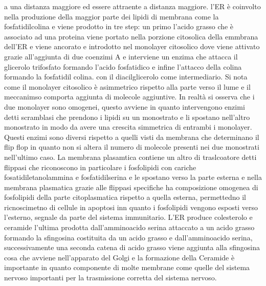 a una distanza maggiore ed essere attraente a distanza maggiore. l'ER \`e coinvolto nella produzione della maggior parte dei lipidi di membrana come la fosfatidilcolina e viene prodotto
in tre step: un primo l'acido grasso che \`e associato ad una proteina viene portato nella porzione citosolica della emmbrana dell'ER e viene ancorato e introdotto nel monolayer 
citosolico dove viene attivato grazie all'aggiunta di due coenzimi A e interviene un enzima che attacca il glicerolo trifosfato formando l'acido fosfatidico e infine l'attacco della 
colina formando la fosfatidil colina.  con il diacilglicerolo come intermediario. Si nota come il monolayer citosolico \`e asimmetrico rispetto alla parte verso il lume e il meccanimso
comporta aggiunta di molecole aggiuntive. In realt\`a si osserva che i due monolayer sono omogenei, questo avviene in quanto intervengono enzimi detti scramblasi che prendono i lipidi
su un monostrato e li spostano nell'altro monostrato in modo da avere una crescita simmetrica di entrambi i monolayer. Questi enzimi sono diversi rispetto a quelli visti da membrana
che determinano il flip flop in quanto non si altera il numero di molecole presenti nei due monostrati nell'ultimo caso. La membrana plasamtica contiene un altro di traslcoatore detti
flippasi che riconoscono in particolare i fosfolipidi con cariche fosatidiletanolammina e fosfatidilserina e le spostano verso la parte esterna e nella membrana plasmatica grazie alle
flippasi specifiche ha composizione omogenea di fosfolipidi della parte citoplasmatica rispetto a quella esterna, permettedno il ricnoscimetno di cellule in apoptosi inn quanto i 
fosfolipidi vengono esposti verso l'esterno, segnale da parte del sistema immunitario. L'ER produce colesterolo e ceramide l'ultima prodotta dall'amminoacido serina attaccato a un
acido grasso formando la sfingosina costituita da un acido grasso e dall'amminoacido serina, successivamente una seconda catena di acido grasso viene aggiunta alla sfingosina cosa che
avviene nell'apparato del Golgi e la formazione della Ceramide \`e importante in quanto componente di molte membrane come quelle del sistema nervoso importanti per la trasmissione 
corretta del sistema nervoso. 
